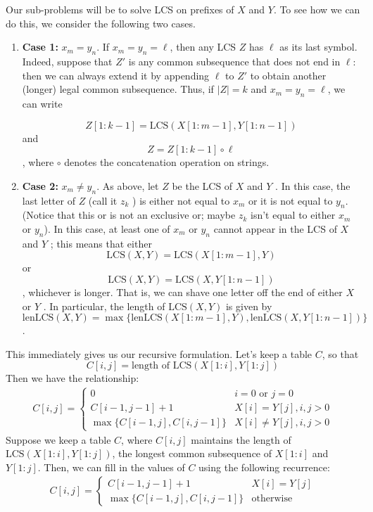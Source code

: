 \documentclass [12pt]{article}
\theoremstyle{definition}
\begin{document}
Our sub-problems will be to solve LCS on prefixes of $X$ and $Y$. To see how we can do this, we consider the following two cases. 

\begin{enumerate}
  \item \textbf{Case 1:} $x_m = y_n$. If $x_m = y_n = \ell$, then any LCS $Z$ has $\ell$ as its last symbol. Indeed, suppose that $Z'$ is any common subsequence that does not end in $\ell$: then we can always extend it by appending $\ell$ to $Z'$ to obtain another (longer) legal common subsequence. Thus, if $|Z| = k$ and $x_m = y_n = \ell$, we can write 

  $$
  Z[1 : k - 1] = \text{LCS}(X[1 : m - 1], Y [1 : n - 1])
  $$ and 
  $$
  Z = Z[1 : k - 1] \circ \ell 
  $$, 
  where $\circ$ denotes the concatenation operation on strings.
  \item \textbf{Case 2:} $x_m \neq y_n$. As above, let $Z$ be the LCS of $X$ and $Y$ . In this case, the last letter of $Z$ (call it $z_k$ ) is either not equal to $x_m$ or it is not equal to $y_n$. (Notice that this or is not an exclusive or; maybe $z_k$ isn't equal to either $x_m$ or $y_n$). In this case, at least one of $x_m$ or $y_n$ cannot appear in the LCS of $X$ and $Y$ ; this means that either 
  $$
    \text{LCS}(X, Y ) = \text{LCS}(X[1 : m - 1], Y )
  $$ 
  or 
  $$
  \text{LCS}(X, Y ) = \text{LCS}(X, Y [1 : n - 1])
  $$,
  whichever is longer. That is, we can shave one letter off the end of either $X$ or $Y$ . In particular, the length of $\text{LCS}(X, Y )$ is given by 
  $$
  \text{lenLCS}(X, Y ) = \max \{\text{lenLCS}(X[1 : m - 1], Y ), \text{lenLCS}(X, Y [1 : n - 1])\}
  $$.
\end{enumerate}

This immediately gives us our recursive formulation. Let's keep a table $C$, so that
$$
C[i,j] = \text{length of LCS}(X[1:i], Y[1:j])
$$
Then we have the relationship:
\begin{align*}
C[i,j] = \begin{cases}
  0 & i = 0 \text{ or } j = 0 \\
  C[i-1, j-1] +1 & X[i] = Y[j], i,j > 0  \\
  \max\{C[i-1, j], C[i, j-1] \} & X[i] \neq Y[j], i,j > 0
\end{cases}
\end{align*}
Suppose we keep a table $C$, where $C[i, j]$ maintains the length of $\text{LCS}(X[1 : i], Y [1 : j])$, the longest common subsequence of $X[1 : i]$ and $Y [1 : j]$. Then, we can fill in the values of $C$ using the following recurrence:
\begin{align*}
C[i,j] = \begin{cases}
  C[i-1, j-1] +1 & X[i] = Y[j]  \\
  \max\{C[i-1, j], C[i, j-1] \} & \text{otherwise}
\end{cases}
\end{align*}
\end{document}
